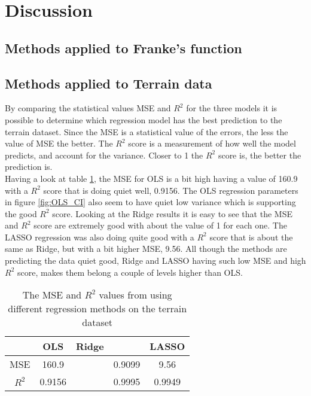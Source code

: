 \documentclass[../main.tex]{subfiles}
\begin{document}
\section{Discussion}\label{sec:discussion}
\subsection{Methods applied to Franke's function}

\subsection{Methods applied to Terrain data}
By comparing the statistical values MSE and $R^2$ for the three models it is possible to determine which regression model has the best prediction to the terrain dataset. Since the MSE is a statistical value of the errors, the less the value of MSE the better. The $R^2$ score is a measurement of how well the model predicts, and account for the variance. Closer to 1 the $R^2$ score is, the better the prediction is.\\

Having a look at table \ref{tab:statistical_results}, the MSE for OLS is a bit high having a value of 160.9 with a $R^2$ score that is doing quiet well, 0.9156. The OLS regression parameters in figure \ref{fig:OLS_CI} also seem to have quiet low variance which is supporting the good $R^2$ score. Looking at the Ridge results it is easy to see that the MSE and $R^2$ score are extremely good with about the value of 1 for each one. The LASSO regression was also doing quite good with a $R^2$ score that is about the same as Ridge, but with a bit higher MSE, 9.56.  All though the methods are predicting the data quiet good, Ridge and LASSO having such low MSE and high $R^2$ score, makes them belong a couple of levels higher than OLS.

\begin{table}[H]
\begin{center}
\begin{tabular}{ |c|c|c|c|c| } 
 \hline
  & OLS & Ridge & & LASSO \\ 
 \hline
 MSE & 160.9 & & 0.9099 & 9.56\\
 \hline
 $R^2$ & 0.9156 & & 0.9995 & 0.9949 \\ 
 \hline
\end{tabular}
\label{tab:statistical_results}
\caption{The MSE and $R^2$ values from using different regression methods on the terrain dataset}
\end{center}
\end{table}
\end{document}
